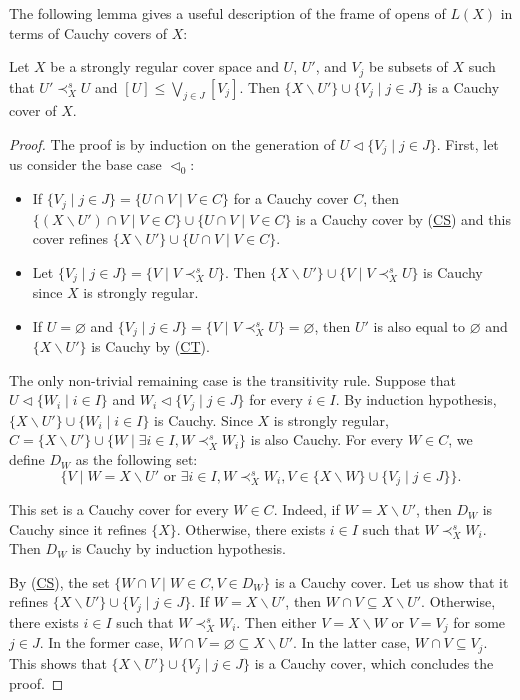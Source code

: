 \documentclass[reqno]{amsart}
\newcommand{\axref}[1]{(\hyperref[ax:#1]{#1})}
\theoremstyle{definition}
\theoremstyle{remark}
\numberwithin{figure}{section}
\newcommand{\rb}{\prec}
\begin{document}
The following lemma gives a useful description of the frame of opens of $L(X)$ in terms of Cauchy covers of $X$:

\begin{lem}
Let $X$ be a strongly regular cover space and $U$, $U'$, and $V_j$ be subsets of $X$ such that $U' \rb^s_X U$ and $[U] \leq \bigvee_{j \in J} [V_j]$.
Then $\{ X \backslash U'\} \cup \{ V_j \mid j \in J \}$ is a Cauchy cover of $X$.
\end{lem}
\begin{proof}
The proof is by induction on the generation of $U \triangleleft \{ V_j \mid j \in J \}$.
First, let us consider the base case $\triangleleft_0$:
\begin{itemize}
\item If $\{ V_j \mid j \in J \} = \{ U \cap V \mid V \in C \}$ for a Cauchy cover $C$, then $\{ (X \backslash U') \cap V \mid V \in C \} \cup \{ U \cap V \mid V \in C \}$ is a Cauchy cover by \axref{CS} and this cover refines $\{ X \backslash U' \} \cup \{ U \cap V \mid V \in C \}$.
\item Let $\{ V_j \mid j \in J \} = \{ V \mid V \rb^s_X U \}$. Then $\{ X \backslash U' \} \cup \{ V \mid V \rb^s_X U \}$ is Cauchy since $X$ is strongly regular.
\item If $U = \varnothing$ and $\{ V_j \mid j \in J \} = \{ V \mid V \rb^s_X U \} = \varnothing$, then $U'$ is also equal to $\varnothing$ and $\{ X \backslash U' \}$ is Cauchy by \axref{CT}.
\end{itemize}
The only non-trivial remaining case is the transitivity rule.
Suppose that $U \triangleleft \{ W_i \mid i \in I \}$ and $W_i \triangleleft \{ V_j \mid j \in J \}$ for every $i \in I$.
By induction hypothesis, $\{ X \backslash U'\} \cup \{ W_i \mid i \in I \}$ is Cauchy.
Since $X$ is strongly regular, $C = \{ X \backslash U'\} \cup \{ W \mid \exists i \in I, W \rb^s_X W_i \}$ is also Cauchy.
For every $W \in C$, we define $D_W$ as the following set:
\[ \{ V \mid W = X \backslash U' \textrm{ or } \exists i \in I, W \rb^s_X W_i, V \in \{ X \backslash W \} \cup \{ V_j \mid j \in J \} \}. \]

This set is a Cauchy cover for every $W \in C$.
Indeed, if $W = X \backslash U'$, then $D_W$ is Cauchy since it refines $\{ X \}$.
Otherwise, there exists $i \in I$ such that $W \rb^s_X W_i$.
Then $D_W$ is Cauchy by induction hypothesis.

By \axref{CS}, the set $\{ W \cap V \mid W \in C, V \in D_W \}$ is a Cauchy cover.
Let us show that it refines $\{ X \backslash U'\} \cup \{ V_j \mid j \in J \}$.
If $W = X \backslash U'$, then $W \cap V \subseteq X \backslash U'$.
Otherwise, there exists $i \in I$ such that $W \rb^s_X W_i$.
Then either $V = X \backslash W$ or $V = V_j$ for some $j \in J$.
In the former case, $W \cap V = \varnothing \subseteq X \backslash U'$.
In the latter case, $W \cap V \subseteq V_j$.
This shows that $\{ X \backslash U'\} \cup \{ V_j \mid j \in J \}$ is a Cauchy cover, which concludes the proof.
\end{proof}
\end{document}
